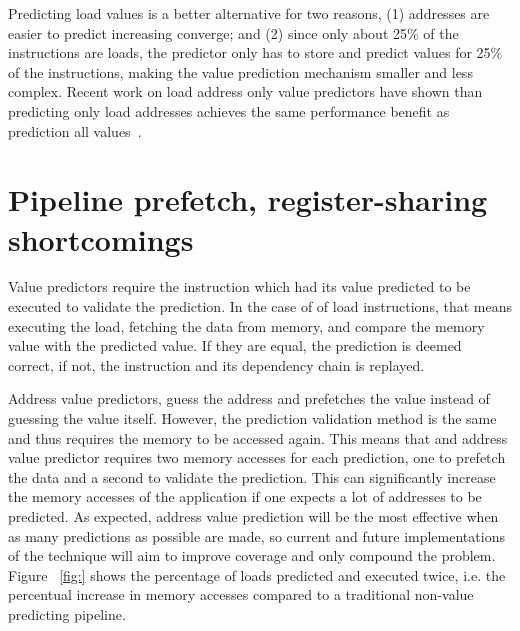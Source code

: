 \documentclass{sig-alternate}
\begin{document}
Predicting load values is a better alternative for two reasons, (1) addresses are easier to predict increasing converge; and (2) since only about 25\% of the instructions are loads, the predictor only has to store and predict values for 25\% of the instructions, making the value prediction mechanism smaller and less complex. Recent work on load address only value predictors have shown than predicting only load addresses achieves the same performance benefit as prediction all values~\cite{}.
































\section{Pipeline prefetch, register-sharing shortcomings}
Value predictors require the instruction which had its value predicted to be executed to validate the prediction. In the case of of load instructions, that means executing the load, fetching the data from memory, and compare the memory value with the predicted value. If they are equal, the prediction is deemed correct, if not, the instruction and its dependency chain is replayed. 

Address value predictors, guess the address and prefetches the value instead of guessing the value itself. However, the prediction validation method is the same and thus requires the memory to be accessed again. This means that and address value predictor requires two memory accesses for each prediction, one to prefetch the data and a second to validate the prediction. This can significantly increase the memory accesses of the application if one expects a lot of addresses to be predicted. As expected, address value prediction will be the most effective when as many predictions as possible are made, so current and future implementations of the technique will aim to improve coverage and only compound the problem. Figure ~\ref{fig:} shows the percentage of loads predicted and executed twice, i.e. the percentual increase in memory accesses compared to a traditional non-value predicting pipeline.
\end{document}
